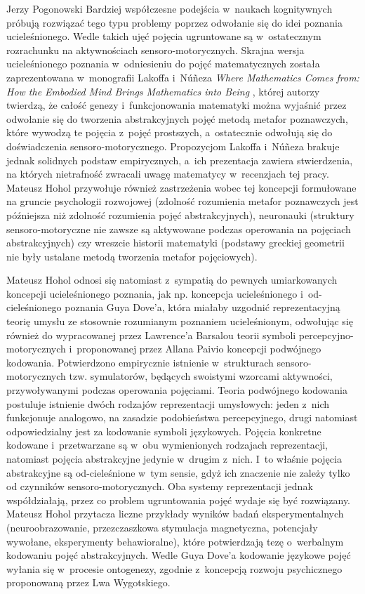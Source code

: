 \begin{newrevplenv}{Jerzy Pogonowski}
Bardziej
współczesne podejścia w~naukach kognitywnych próbują rozwiązać
tego typu problemy poprzez odwołanie się do idei poznania
ucieleśnionego. Wedle takich ujęć pojęcia ugruntowane są w~ostatecznym rozrachunku na aktywnościach sensoro-motorycznych.
Skrajna wersja ucieleśnionego poznania w~odniesieniu do pojęć
matematycznych została zaprezentowana w~monografii Lakoffa i~N\'{u}\~{n}eza {\em Where Mathematics Comes from: How the Embodied Mind Brings Mathematics into Being} \parencite{lakoff_where_2000},
której autorzy twierdzą, że całość genezy i~funkcjonowania
matematyki można wyjaśnić przez odwołanie się do tworzenia
abstrakcyjnych pojęć metodą metafor poznawczych, które wywodzą te
pojęcia z~pojęć prostszych, a~ostatecznie odwołują się do
doświadczenia sensoro-motorycznego. Propozycjom Lakoffa i~N\'{u}\~{n}eza brakuje jednak solidnych podstaw empirycznych, a~ich prezentacja zawiera stwierdzenia, na których nietrafność
zwracali uwagę matematycy w~recenzjach tej pracy. Mateusz Hohol
przywołuje również zastrzeżenia wobec tej koncepcji formułowane na
gruncie psychologii rozwojowej (zdolność rozumienia metafor
poznawczych jest późniejsza niż zdolność rozumienia pojęć
abstrakcyjnych), neuronauki (struktury sensoro-motoryczne nie
zawsze są aktywowane podczas operowania na pojęciach
abstrakcyjnych) czy wreszcie historii matematyki (podstawy
greckiej geometrii nie były ustalane metodą tworzenia metafor
pojęciowych). 

Mateusz Hohol odnosi się natomiast z~sympatią do
pewnych umiarkowanych koncepcji ucieleśnionego poznania, jak np.
koncepcja ucieleśnionego i~od-cieleśnionego poznania Guya Dove'a,
która miałaby uzgodnić reprezentacyjną teorię umysłu ze stosownie
rozumianym poznaniem ucieleśnionym, odwołując się również do
wypracowanej przez Lawrence'a Barsalou teorii symboli
percepcyjno-motorycznych i~proponowanej przez Allana Paivio
koncepcji podwójnego kodowania. Potwierdzono empirycznie istnienie
w~strukturach sensoro-motorycznych tzw. symulatorów, będących
swoistymi wzorcami aktywności, przywoływanymi podczas operowania
pojęciami. Teoria podwójnego kodowania postuluje istnienie dwóch
rodzajów reprezentacji umysłowych: jeden z~nich funkcjonuje
analogowo, na zasadzie podobieństwa percepcyjnego, drugi natomiast
odpowiedzialny jest za kodowanie symboli językowych. Pojęcia
konkretne kodowane i~przetwarzane są w~obu wymienionych rodzajach
reprezentacji, natomiast pojęcia abstrakcyjne jedynie w~drugim z~nich. I~to właśnie pojęcia abstrakcyjne są od-cieleśnione w~tym
sensie, gdyż ich znaczenie nie zależy tylko od czynników
sensoro-motorycznych. Oba systemy reprezentacji jednak
współdziałają, przez co problem ugruntowania pojęć wydaje się być
rozwiązany. Mateusz Hohol przytacza liczne przykłady wyników badań
eksperymentalnych (neuroobrazowanie, przezczaszkowa stymulacja
magnetyczna, potencjały wywołane, eksperymenty behawioralne),
które potwierdzają tezę o~werbalnym kodowaniu pojęć
abstrakcyjnych. Wedle Guya Dove'a kodowanie językowe pojęć wyłania
się w~procesie ontogenezy, zgodnie z~koncepcją rozwoju
psychicznego proponowaną przez Lwa Wygotskiego.


\end{newrevplenv}
